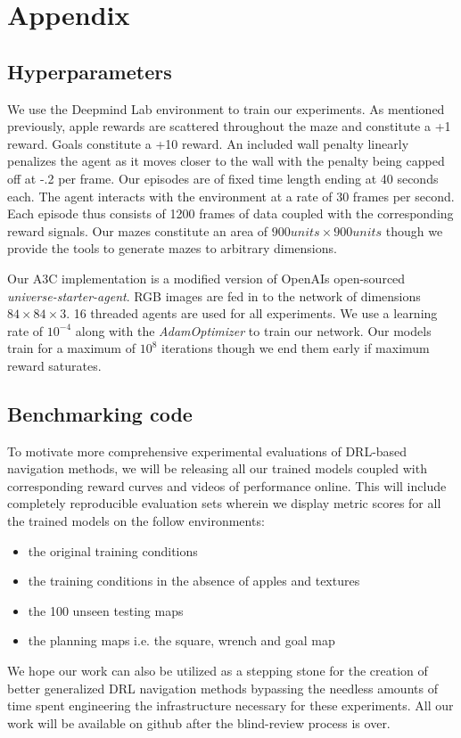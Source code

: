\section*{Appendix}

\subsection*{Hyperparameters}
We use the Deepmind Lab environment to train our experiments. 
As mentioned previously, apple rewards are scattered throughout the maze and constitute a +1 reward. 
Goals constitute a +10 reward. An included wall penalty linearly penalizes the agent as it moves closer to the wall with the penalty being capped off at -.2 per frame.
Our episodes are of fixed time length ending at 40 seconds each.
The agent interacts with the environment at a rate of 30 frames per second. 
Each episode thus consists of 1200 frames of data coupled with the corresponding reward signals.
Our mazes constitute an area of $900 units \times 900 units$ though we provide the tools to generate mazes to arbitrary dimensions. 

Our A3C implementation is a modified version of OpenAIs open-sourced \emph{universe-starter-agent}. RGB images are fed in to the network of dimensions $84\times84\times3$. 16 threaded agents are used for all experiments. We use a learning rate of $10^{-4}$ along with the \emph{AdamOptimizer} to train our network. Our models train for a maximum of $10^{8}$ iterations though we end them early if maximum reward saturates. 

\subsection*{Benchmarking code}
To motivate more comprehensive experimental evaluations of DRL-based navigation methods, we will be releasing all our trained models coupled with corresponding reward curves and videos of performance online. 
This will include completely reproducible evaluation sets wherein we display metric scores for all the trained models on the follow environments:
\begin{itemize}
    \item the original training conditions
    \item the training conditions in the absence of apples and textures
    \item the 100 unseen testing maps
    \item the planning maps i.e. the square, wrench and goal map
\end{itemize}
We hope our work can also be utilized as a stepping stone for the creation of better generalized DRL navigation methods bypassing the needless amounts of time spent engineering the infrastructure necessary for these experiments. 
All our work will be available on github after the blind-review process is over.

